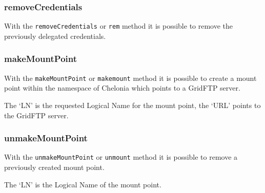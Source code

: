 \subsubsection{removeCredentials} %
\label{ssub:removecredentials}
With the \texttt{removeCredentials} or \texttt{rem} method it is possible to remove the previously delegated credentials.
\hspace*{0.5cm}
\begin{shaded}
\end{shaded}

\subsubsection{makeMountPoint} %
\label{ssub:makemountpoint}
With the \texttt{makeMountPoint} or \texttt{makemount} method it is possible to create a mount point within the namespace of Chelonia which points to a GridFTP server.
\hspace*{0.5cm}
\begin{shaded}
\end{shaded}

The `LN' is the requested Logical Name for the mount point, the `URL' points to the GridFTP server.

\subsubsection{unmakeMountPoint} %
\label{ssub:unmakemountpoint}
With the \texttt{unmakeMountPoint} or \texttt{unmount} method it is possible to remove a previously created mount point.
\hspace*{0.5cm}
\begin{shaded}
\end{shaded}

The `LN' is the Logical Name of the mount point.
